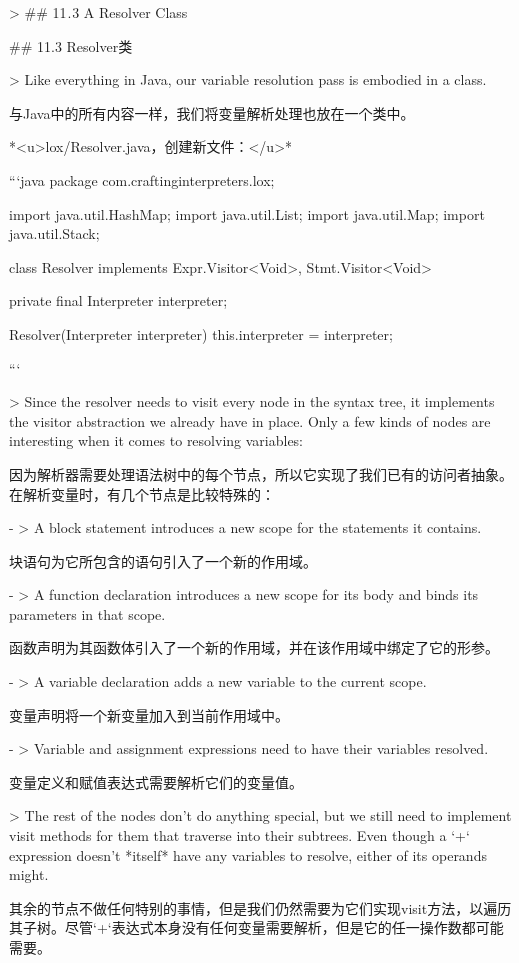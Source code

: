 \documentclass[cn,11pt,chinese]{elegantbook}
\begin{document}
{{{{{{{{{{{{> ## 11 . 3 A Resolver Class

## 11.3 Resolver类

> Like everything in Java, our variable resolution pass is embodied in a class.

与Java中的所有内容一样，我们将变量解析处理也放在一个类中。

*<u>lox/Resolver.java，创建新文件：</u>*

```java
package com.craftinginterpreters.lox;

import java.util.HashMap;
import java.util.List;
import java.util.Map;
import java.util.Stack;

class Resolver implements Expr.Visitor<Void>, Stmt.Visitor<Void> {
  private final Interpreter interpreter;

  Resolver(Interpreter interpreter) {
    this.interpreter = interpreter;
  }
}
```

> Since the resolver needs to visit every node in the syntax tree, it implements the visitor abstraction we already have in place. Only a few kinds of nodes are interesting when it comes to resolving variables:

因为解析器需要处理语法树中的每个节点，所以它实现了我们已有的访问者抽象。在解析变量时，有几个节点是比较特殊的：

- > A block statement introduces a new scope for the statements it contains.

  块语句为它所包含的语句引入了一个新的作用域。

- > A function declaration introduces a new scope for its body and binds its parameters in that scope.

  函数声明为其函数体引入了一个新的作用域，并在该作用域中绑定了它的形参。

- > A variable declaration adds a new variable to the current scope.

  变量声明将一个新变量加入到当前作用域中。

- > Variable and assignment expressions need to have their variables resolved.

  变量定义和赋值表达式需要解析它们的变量值。

> The rest of the nodes don’t do anything special, but we still need to implement visit methods for them that traverse into their subtrees. Even though a `+` expression doesn’t *itself* have any variables to resolve, either of its operands might.

其余的节点不做任何特别的事情，但是我们仍然需要为它们实现visit方法，以遍历其子树。尽管`+`表达式本身没有任何变量需要解析，但是它的任一操作数都可能需要。

}}}}}}}}}}}}
\end{document}
